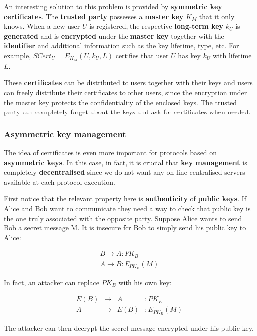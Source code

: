 An interesting solution to this problem is provided by \textbf{symmetric key certificates}. The \textbf{trusted party} possesses a \textbf{master key} $K_M$ that it only knows. When a new user $U$ is registered, the respective \textbf{long-term key} $k_U$ is \textbf{generated} and is \textbf{encrypted} under the \textbf{master key} together with the \textbf{identifier} and additional information such as the key lifetime, type, etc. For example, $SCert_U = E_{K_M}(U,k_U,L)$ certifies that user $U$ has key $k_U$ with lifetime $L$.

These \textbf{certificates} can be distributed to users together with their keys and users can freely distribute their certificates to other users, since the encryption under the master key protects the confidentiality of the enclosed keys. The trusted party can completely forget about the keys and ask for certificates when needed. 

\subsubsection{Asymmetric key management}
The idea of certificates is even more important for protocols based on \textbf{asymmetric keys}. In this case, in fact, it is crucial that \textbf{key management} is completely \textbf{decentralised} since we do not want any on-line centralised servers available at each protocol execution.

First notice that the relevant property here is \textbf{authenticity} of \textbf{public keys}. If Alice and Bob want to communicate they need a way to check that public key is the one truly associated with the opposite party. Suppose Alice wants to send Bob a secret message M. It is insecure for Bob to simply send his public key to Alice:

$$\begin{array}{l} B \rightarrow A: PK_B \\ A\rightarrow B: E_{PK_B}(M) \end{array}$$

In fact, an attacker can replace $PK_B$ with his own key:

$$\begin{array}{cccl} E(B) & \rightarrow & A &: PK_E \\ A & \rightarrow & E(B) & : E_{PK_E}(M) \end{array}$$

The attacker can then decrypt the secret message encrypted under his public key.

